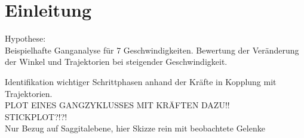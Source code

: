 \section{Einleitung}
Hypothese:\\
Beispielhafte Ganganalyse für 7 Geschwindigkeiten.
Bewertung der Veränderung der Winkel und Trajektorien bei steigender Geschwindigkeit.

Identifikation wichtiger Schrittphasen anhand der Kräfte in Kopplung mit Trajektorien.\\

PLOT EINES GANGZYKLUSSES MIT KRÄFTEN DAZU!!\\
STICKPLOT?!?!\\
Nur Bezug auf Saggitalebene, hier Skizze rein mit beobachtete Gelenke\\\\

